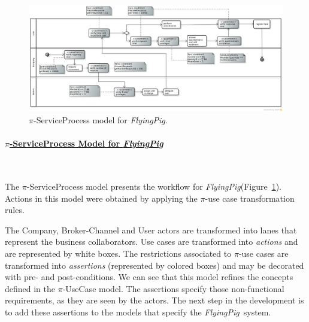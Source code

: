 \documentclass[12pt,twoside]{article}
\theoremstyle{plain}
\theoremstyle{plain}
\def\FlyingPig{\textsl{FlyingPig}\xspace}
\begin{document}
\begin{multicols}{2}

\begin{figure}
\centering
\includegraphics[width=1.0\textwidth]{ServiceProcessGeneralCut.png}
\caption{$\pi$-ServiceProcess model for \FlyingPig.\label{fig:PiServiceProcessModel}}
\end{figure}

\paragraph{\underline{$\pi$-ServiceProcess Model for \FlyingPig}}~

The $\pi$-ServiceProcess model presents the workflow for \FlyingPig (Figure~\ref{fig:PiServiceProcessModel}).
Actions in this model were obtained by applying the $\pi$-use case transformation rules.

The \textsf{Company}, \textsf{Broker-Channel} and \textsf{User} actors are transformed into lanes that represent the business collaborators.
Use cases are transformed into \textit{actions} and are represented by white boxes.
The restrictions associated to  $\pi$-use cases are transformed into \textit{assertions} (represented by colored boxes) and may be decorated with pre- and post-conditions.
We can see that this model refines the concepts defined in the $\pi$-UseCase model.
The assertions specify those non-functional requirements, as they are seen by the actors.
The next step in the development is to add these assertions to the models that specify the \FlyingPig\ system.


\end{multicols}
\end{document}
